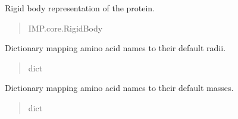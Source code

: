 \documentclass[letterpaper,10pt,english]{sphinxmanual}
\begin{document}
\begin{fulllineitems}
\begin{fulllineitems}
\begin{quote}
\begin{description}
\end{description}\end{quote}

\end{fulllineitems}


\begin{fulllineitems}
\label{\detokenize{src:src.Protein_Class.ProteinStructure.prb}}
\pysigstartsignatures
{}
\pysigstopsignatures
\sphinxAtStartPar
Rigid body representation of the protein.
\begin{quote}\begin{description}
\sphinxAtStartPar
IMP.core.RigidBody

\end{description}\end{quote}

\end{fulllineitems}


\begin{fulllineitems}
\label{\detokenize{src:src.Protein_Class.ProteinStructure.amino_acid_radii}}
\pysigstartsignatures
{}
\pysigstopsignatures
\sphinxAtStartPar
Dictionary mapping amino acid names to their default radii.
\begin{quote}\begin{description}
\sphinxAtStartPar
dict

\end{description}\end{quote}

\end{fulllineitems}


\begin{fulllineitems}
\label{\detokenize{src:src.Protein_Class.ProteinStructure.amino_acid_mass}}
\pysigstartsignatures
{}
\pysigstopsignatures
\sphinxAtStartPar
Dictionary mapping amino acid names to their default masses.
\begin{quote}\begin{description}
\sphinxAtStartPar
dict


\end{description}
\end{quote}
\end{fulllineitems}
\end{fulllineitems}
\end{document}
